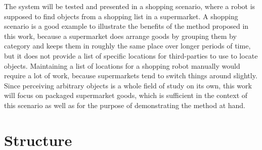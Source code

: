 The system will be tested and presented in a shopping scenario, where a robot is supposed to find objects from a shopping list in a supermarket. A shopping scenario is a good example to illustrate the benefits of the method proposed in this work, because a supermarket does arrange goods by grouping them by category and keeps them in roughly the same place over longer periods of time, but it does not provide a list of specific locations for third-parties to use to locate objects. Maintaining a list of locations for a shopping robot manually would require a lot of work, because supermarkets tend to switch things around slightly. \\

Since perceiving arbitrary objects is a whole field of study on its own, this work will focus on packaged supermarket goods, which is sufficient in the context of this scenario as well as for the purpose of demonstrating the method at hand.

\section{Structure}
